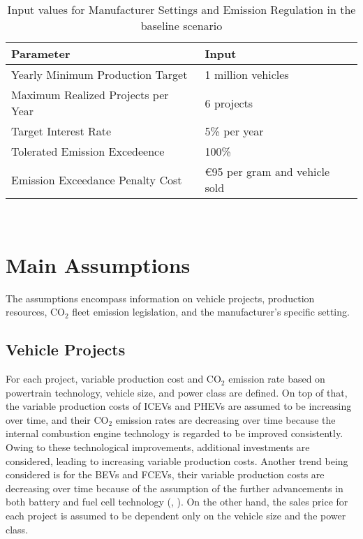 \begin{table}[h]
\centering
\begin{tabular}{l|l}
\toprule
Parameter&Input\\
\midrule
Yearly Minimum Production Target&1 million vehicles\\
Maximum Realized Projects per Year&6 projects\\
Target Interest Rate&5\% per year\\
Tolerated Emission Excedeence&100\%\\
Emission Exceedance Penalty Cost& \euro{95} per gram and vehicle sold\\
\bottomrule
\end{tabular}
\caption{Input values for Manufacturer Settings and Emission Regulation in the baseline scenario}\label{tab:manufacturerparams}
\end{table}\\
\section{Main Assumptions}\label{sec:Main Assumptions}
The assumptions encompass information on vehicle projects, production resources, $\text{CO}_{2}$ fleet emission legislation, and the manufacturer's specific setting.\\

\subsection{Vehicle Projects}\label{vehicleprojects}
For each project, variable production cost and $\text{CO}_{2}$ emission rate based on powertrain technology, vehicle size, and power class are defined. On top of that, the variable production costs of  \gls{ICEV}s and \gls{PHEV}s are assumed to be increasing over time, and their $\text{CO}_{2}$ emission rates are decreasing over time because the internal combustion engine technology is regarded to be improved consistently. Owing to these technological improvements, additional investments are considered, leading to increasing variable production costs. Another trend being considered is for the \gls{BEV}s and \gls{FCEV}s, their variable production costs are decreasing over time because of the assumption of the further advancements in both battery and fuel cell technology (\cite{berckmans2017}, \cite{Lutsey2029}). On the other hand, the sales price for each project is assumed to be dependent only on the vehicle size and the power class.\\

